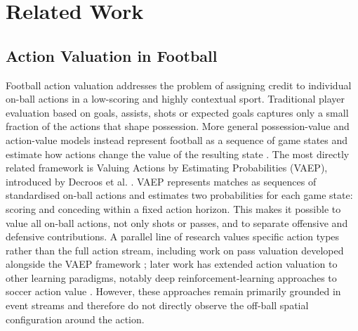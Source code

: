 \documentclass[runningheads]{llncs}
\begin{document}
\section{Related Work}
\subsection{Action Valuation in Football}
Football action valuation addresses the problem of assigning credit to individual on-ball actions in a low-scoring and highly contextual sport. Traditional player
evaluation based on goals, assists, shots or expected goals captures only a small fraction of the actions that shape possession. More general possession-value and
action-value models instead represent football as a sequence of game states and estimate how actions change the value of the resulting state \cite{decroos2019actions,liu2020deep}.
The most directly related framework is Valuing Actions by Estimating Probabilities (VAEP), introduced by Decroos et al. \cite{decroos2019actions}. VAEP represents matches as sequences of standardised on-ball actions and estimates two probabilities for each game state: scoring and conceding within a fixed action horizon. This makes it possible to value all on-ball actions, not only shots or passes, and to separate offensive and defensive contributions. A parallel line of research values specific action types rather than the full action stream, including work on pass valuation developed alongside the VAEP framework \cite{bransen2019passes}; later work has extended action valuation to other learning paradigms, notably deep reinforcement-learning approaches to soccer action value \cite{liu2020deep}. However, these approaches remain primarily grounded in event streams and therefore do not directly observe the off-ball spatial configuration around the action.
\end{document}
